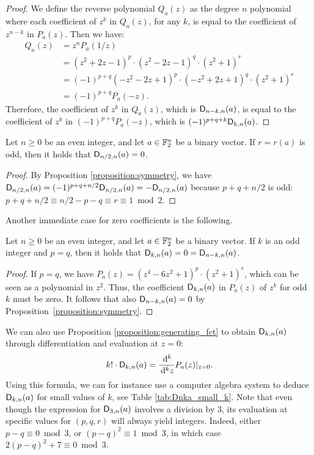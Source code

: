 \documentclass[11pt]{llncs}
\begin{document}
\begin{proof}
	We define the reverse polynomial  $Q_a(z)$ as the degree $n$ polynomial where each coefficient of $z^k$ in $Q_a(z)$, for any $k$, is equal to the coefficient of $z^{n-k}$ in $P_a(z)$. 
	Then we have:
	\begin{align*}
		Q_a(z)&=z^nP_a(1/z)\\
		&=(z^2+2z-1)^p\cdot(z^2-2z-1)^q\cdot(z^2+1)^r\\
		&=(-1)^{p+q}(-z^2-2z+1)^p\cdot(-z^2+2z+1)^q\cdot(z^2+1)^r\\
		&=(-1)^{p+q}P_a(-z).
	\end{align*}
	Therefore, the coefficient of $z^k$ in $Q_a(z)$, which is $\Dnka n{n-k}a$, is equal to the coefficient of $z^k$ in $(-1)^{p+q}P_a(-z)$, which is $(-1)^{p+q+k}\Dnka nka$.
\end{proof}

\begin{Corollary}
    Let $n\geq 0$ be an even integer, and let $a\in\F_2^n$ be a binary vector. If $r=r(a)$ is odd, then it holds that $\Dnka n{n/2}a=0$.
\end{Corollary}

\begin{proof}
	By Proposition \ref{proposition:symmetry}, we have $\Dnka n{n/2}a=(-1)^{p+q+n/2}\Dnka n{n/2}a=-\Dnka n{n/2}a$ because $p+q+n/2$ is odd: $p+q+n/2\equiv n/2-p-q\equiv r\equiv 1\bmod 2$.
\end{proof}

Another immediate case for zero coefficients is the following.

\begin{proposition}
    Let $n\geq 0$ be an even integer, and let $a\in\F_2^n$ be a binary vector. If $k$ is an odd integer and  $p=q$, then it holds that $\Dnka nka=0=\Dnka n{n-k}a$.
\end{proposition}

\begin{proof}
    If $p=q$, we have $P_a(z)=(z^4-6z^2+1)^p\cdot(z^2+1)^r$, which can be seen as a polynomial in $z^2$. Thus, the coefficient $\Dnka nka$ in $P_a(z)$ of $z^k$ for odd $k$ must be zero. It follows that also $\Dnka n{n-k}a=0$ by Proposition~\ref{proposition:symmetry}.
\end{proof}

\begin{remark}\label{remark:D_nka_differentiation}
    We can also use Proposition \ref{proposition:generating_fct} to obtain $\Dnka nka$ through differentiation and evaluation at $z=0$:
    \[
        k!\cdot\Dnka nka=\frac{\dd^k}{\dd^k z}P_a(z)\vert_{z=0}.
    \]
    Using this formula, we can for instance use a computer algebra system to deduce $\Dnka nka$ for small values of $k$, see Table \ref{tab:Dnka_small_k}. Note that even though the expression for $\Dnka n3a$ involves a division by $3$, its evaluation at specific values for $(p,q,r)$ will always yield integers. Indeed, either $p-q\equiv 0\bmod 3$, or $(p-q)^2\equiv 1\bmod 3$, in which case $2(p-q)^2+7\equiv 0\bmod 3$.
\end{remark}
\end{document}
